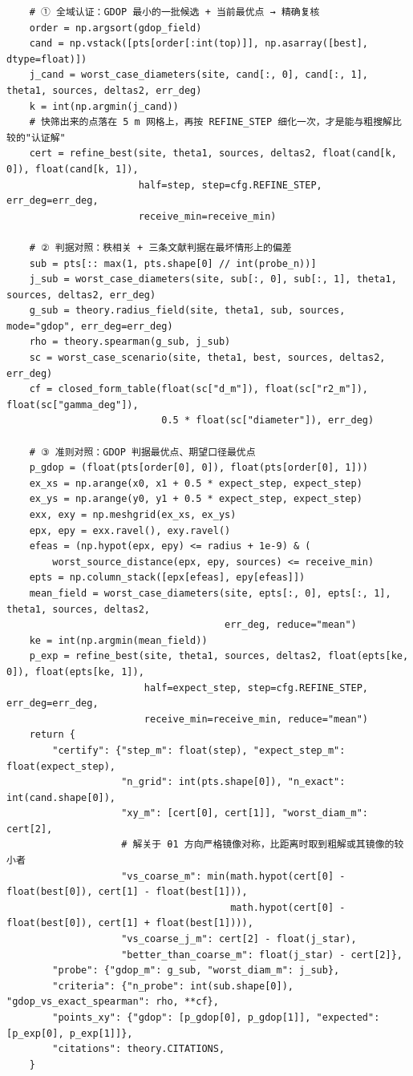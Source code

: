 \documentclass[UTF8, zihao=5,AutoFakeBold=2]{ctexart}
\begin{document}
\begin{lstlisting}
    # ① 全域认证：GDOP 最小的一批候选 + 当前最优点 → 精确复核
    order = np.argsort(gdop_field)
    cand = np.vstack([pts[order[:int(top)]], np.asarray([best], dtype=float)])
    j_cand = worst_case_diameters(site, cand[:, 0], cand[:, 1], theta1, sources, deltas2, err_deg)
    k = int(np.argmin(j_cand))
    # 快筛出来的点落在 5 m 网格上，再按 REFINE_STEP 细化一次，才是能与粗搜解比较的"认证解"
    cert = refine_best(site, theta1, sources, deltas2, float(cand[k, 0]), float(cand[k, 1]),
                       half=step, step=cfg.REFINE_STEP, err_deg=err_deg,
                       receive_min=receive_min)

    # ② 判据对照：秩相关 + 三条文献判据在最坏情形上的偏差
    sub = pts[:: max(1, pts.shape[0] // int(probe_n))]
    j_sub = worst_case_diameters(site, sub[:, 0], sub[:, 1], theta1, sources, deltas2, err_deg)
    g_sub = theory.radius_field(site, theta1, sub, sources, mode="gdop", err_deg=err_deg)
    rho = theory.spearman(g_sub, j_sub)
    sc = worst_case_scenario(site, theta1, best, sources, deltas2, err_deg)
    cf = closed_form_table(float(sc["d_m"]), float(sc["r2_m"]), float(sc["gamma_deg"]),
                           0.5 * float(sc["diameter"]), err_deg)

    # ③ 准则对照：GDOP 判据最优点、期望口径最优点
    p_gdop = (float(pts[order[0], 0]), float(pts[order[0], 1]))
    ex_xs = np.arange(x0, x1 + 0.5 * expect_step, expect_step)
    ex_ys = np.arange(y0, y1 + 0.5 * expect_step, expect_step)
    exx, exy = np.meshgrid(ex_xs, ex_ys)
    epx, epy = exx.ravel(), exy.ravel()
    efeas = (np.hypot(epx, epy) <= radius + 1e-9) & (
        worst_source_distance(epx, epy, sources) <= receive_min)
    epts = np.column_stack([epx[efeas], epy[efeas]])
    mean_field = worst_case_diameters(site, epts[:, 0], epts[:, 1], theta1, sources, deltas2,
                                      err_deg, reduce="mean")
    ke = int(np.argmin(mean_field))
    p_exp = refine_best(site, theta1, sources, deltas2, float(epts[ke, 0]), float(epts[ke, 1]),
                        half=expect_step, step=cfg.REFINE_STEP, err_deg=err_deg,
                        receive_min=receive_min, reduce="mean")
    return {
        "certify": {"step_m": float(step), "expect_step_m": float(expect_step),
                    "n_grid": int(pts.shape[0]), "n_exact": int(cand.shape[0]),
                    "xy_m": [cert[0], cert[1]], "worst_diam_m": cert[2],
                    # 解关于 θ1 方向严格镜像对称，比距离时取到粗解或其镜像的较小者
                    "vs_coarse_m": min(math.hypot(cert[0] - float(best[0]), cert[1] - float(best[1])),
                                       math.hypot(cert[0] - float(best[0]), cert[1] + float(best[1]))),
                    "vs_coarse_j_m": cert[2] - float(j_star),
                    "better_than_coarse_m": float(j_star) - cert[2]},
        "probe": {"gdop_m": g_sub, "worst_diam_m": j_sub},
        "criteria": {"n_probe": int(sub.shape[0]), "gdop_vs_exact_spearman": rho, **cf},
        "points_xy": {"gdop": [p_gdop[0], p_gdop[1]], "expected": [p_exp[0], p_exp[1]]},
        "citations": theory.CITATIONS,
    }


\end{lstlisting}
\end{document}
